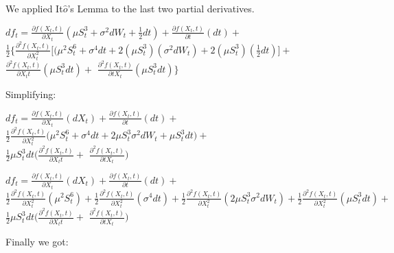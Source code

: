 \documentclass[12pt]{article}
\begin{document}
\hfill

We applied  It$\hat{o}$'s Lemma to the last two partial derivatives.


\begin{center}
${df_t =  \frac{\partial f(X_t,t)}{\partial X_t}(\mu S_t^{3} + \sigma^{2}dW_t + \frac{1}{2}dt) + \frac{\partial f(X_t,t)}{\partial t}(dt) +}$\\
${\frac{1}{2}\Big\{\frac{\partial^2 f(X_t,t)}{\partial X_t^2}\Big[(\mu^2 S_t^{6} + \sigma^{4}dt 
+ 2(\mu S_t^{3})(\sigma^{2}dW_t) + 2(\mu S_t^{3})(\frac{1}{2}dt)\Big] +}$\\
 ${\frac{\partial^2 f(X_t,t)}{\partial X_t t}(\mu S_t^{3}dt)+}$
${\frac{\partial^2 f(X_t,t)}{\partial t X_t}(\mu S_t^{3}dt)\Big\}}$

\end{center}

\newpage



Simplifying:

\begin{center}
${df_t =  \frac{\partial f(X_t,t)}{\partial X_t}(dX_t) + \frac{\partial f(X_t,t)}{\partial t}(dt) +}$\\
${\frac{1}{2}\frac{\partial^2 f(X_t,t)}{\partial X_t^2}\Big(\mu^2 S_t^{6} + \sigma^{4}dt 
+ 2\mu S_t^{3}\sigma^{2}dW_t + \mu S_t^{3}dt\Big) +}$\\
 ${\frac{1}{2}\mu S_t^{3}dt\Big(\frac{\partial^2 f(X_t,t)}{\partial X_t t}+}$
${\frac{\partial^2 f(X_t,t)}{\partial t X_t}\Big)}$

\end{center}

\hfill

\begin{center}
${df_t =  \frac{\partial f(X_t,t)}{\partial X_t}(dX_t) + \frac{\partial f(X_t,t)}{\partial t}(dt) +}$\\
${\frac{1}{2}\frac{\partial^2 f(X_t,t)}{\partial X_t^2}(\mu^2 S_t^{6}) + \frac{1}{2}\frac{\partial^2 f(X_t,t)}{\partial X_t^2}(\sigma^{4}dt) 
+ \frac{1}{2}\frac{\partial^2 f(X_t,t)}{\partial X_t^2}(2\mu S_t^{3}\sigma^{2}dW_t) + 
\frac{1}{2}\frac{\partial^2 f(X_t,t)}{\partial X_t^2}(\mu S_t^{3}dt) +}$\\
 ${\frac{1}{2}\mu S_t^{3}dt\Big(\frac{\partial^2 f(X_t,t)}{\partial X_t t}+}$
${\frac{\partial^2 f(X_t,t)}{\partial t X_t}\Big)}$

\end{center}


Finally we got:

\hfill
\end{document}
